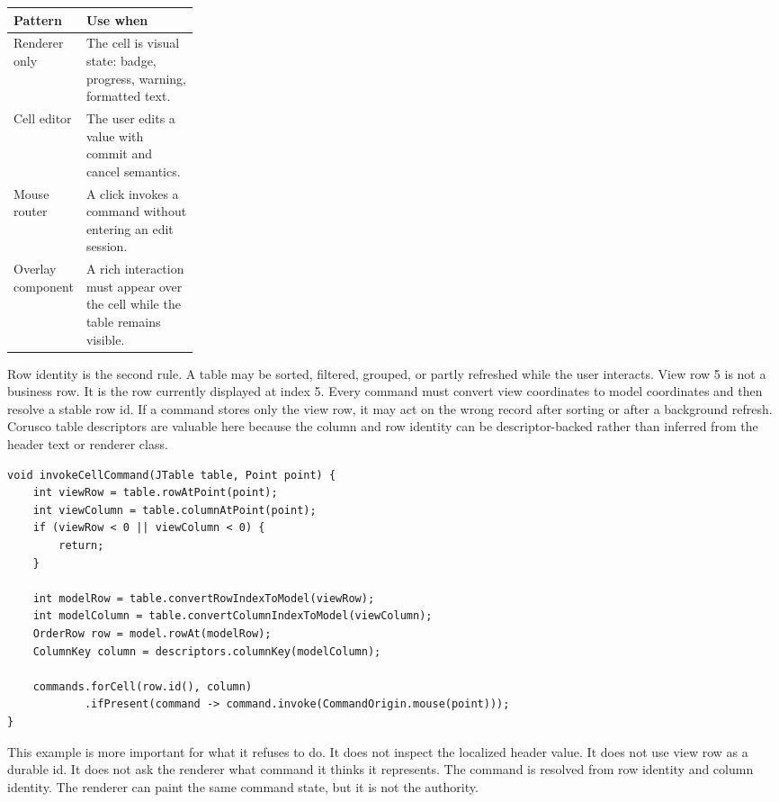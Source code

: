 \begin{tabularx}{0.96\linewidth}{@{}p{0.24\linewidth}X@{}}
\toprule
Pattern & Use when\\
\midrule
Renderer only & The cell is visual state: badge, progress, warning, formatted text.\\
Cell editor & The user edits a value with commit and cancel semantics.\\
Mouse router & A click invokes a command without entering an edit session.\\
Overlay component & A rich interaction must appear over the cell while the table remains visible.\\
\bottomrule
\end{tabularx}

Row identity is the second rule. A table may be sorted, filtered, grouped, or
partly refreshed while the user interacts. View row 5 is not a business row. It
is the row currently displayed at index 5. Every command must convert view
coordinates to model coordinates and then resolve a stable row id. If a command
stores only the view row, it may act on the wrong record after sorting or after a
background refresh. Corusco table descriptors are valuable here because the
column and row identity can be descriptor-backed rather than inferred from the
header text or renderer class.

\begin{lstlisting}[caption={Interactive cell commands convert coordinates before resolving row identity.}]
void invokeCellCommand(JTable table, Point point) {
    int viewRow = table.rowAtPoint(point);
    int viewColumn = table.columnAtPoint(point);
    if (viewRow < 0 || viewColumn < 0) {
        return;
    }

    int modelRow = table.convertRowIndexToModel(viewRow);
    int modelColumn = table.convertColumnIndexToModel(viewColumn);
    OrderRow row = model.rowAt(modelRow);
    ColumnKey column = descriptors.columnKey(modelColumn);

    commands.forCell(row.id(), column)
            .ifPresent(command -> command.invoke(CommandOrigin.mouse(point)));
}
\end{lstlisting}

This example is more important for what it refuses to do. It does not inspect the
localized header value. It does not use view row as a durable id. It does not
ask the renderer what command it thinks it represents. The command is resolved
from row identity and column identity. The renderer can paint the same command
state, but it is not the authority.

